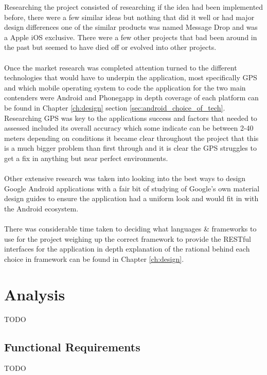 Researching the project consisted of researching if the idea had been implemented before, there were a few similar ideas but nothing that did it well or had major design differences one of the similar products was named Message Drop \cite{dmt:dropmessageteam:2015:online} and was a Apple iOS exclusive. There were a few other projects that bad been around in the past but seemed to have died off or evolved into other projects.\\
\\
Once the market research was completed attention turned to the different technologies that would have to underpin the application, most specifically GPS and which mobile operating system to code the application for the two main contenders were Android and Phonegapp in depth coverage of each platform can be found in Chapter \ref{ch:design} section \ref{sec:android_choice_of_tech}. Researching GPS was key to the applications success and factors that needed to assessed included its overall accuracy which some indicate can be between 2-40 meters \cite{DevdattaTengshe:gpsacuracy:2012:online} depending on conditions it became clear throughout the project that this is a much bigger problem than first through and it is clear the GPS struggles to get a fix in anything but near perfect environments.\\
\\
Other extensive research was taken into looking into the best ways to design Google Android applications with a fair bit of studying of Google's own material design guides to ensure the application had a uniform look and would fit in with the Android ecosystem.\\
\\
There was considerable time taken to deciding what languages \& frameworks to use for the project weighing up the correct framework to provide the RESTful interfaces for the application in depth explanation of the rational behind each choice in framework can be found in Chapter \ref{ch:design}.

\section{Analysis}

{TODO}

\subsection{Functional Requirements}

{TODO}

